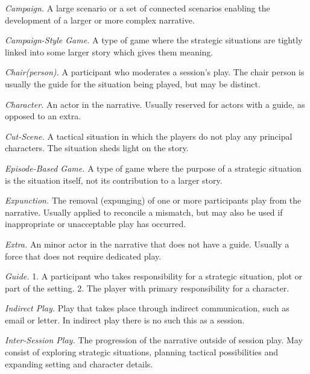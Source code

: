\documentclass[twoside]{book}
\begin{document}
\begin{description}

\item{\it Campaign.} A large scenario or a set of connected scenarios enabling
the development of a larger or more complex narrative.

\item{\it Campaign-Style Game.} A type of game where the strategic situations are
tightly linked into some larger story which gives them meaning.

\item{\it Chair(person).} A participant who moderates a session's play. The chair
person is usually the guide for the situation being played, but may be
distinct.

\item{\it Character.} An actor in the narrative. Usually reserved for actors with
a guide, as opposed to an extra.

\item{\it Cut-Scene.} A tactical situation in which the players do not play any
principal characters. The situation sheds light on the story.

\item{\it Episode-Based Game.} A type of game where the purpose of a strategic
situation is the situation itself, not its contribution to a larger
story.

\item{\it Expunction.} The removal (expunging) of one or more participants play
from the narrative. Usually applied to reconcile a mismatch, but may
also be used if inappropriate or unacceptable play has occurred.

\item{\it Extra.} An minor actor in the narrative that does not have a
guide. Usually a force that does not require dedicated play.

\item{\it Guide.} 1. A participant who takes responsibility for a strategic
situation, plot or part of the setting. 2. The player with primary
responsibility for a character.

\item{\it Indirect Play.} Play that takes place through indirect communication,
such as email or letter. In indirect play there is no such this as a
session.

\item{\it Inter-Session Play.} The progression of the narrative outside of
session play. May consist of exploring strategic situations, planning
tactical possibilities and expanding setting and character details.


\end{description}
\end{document}
